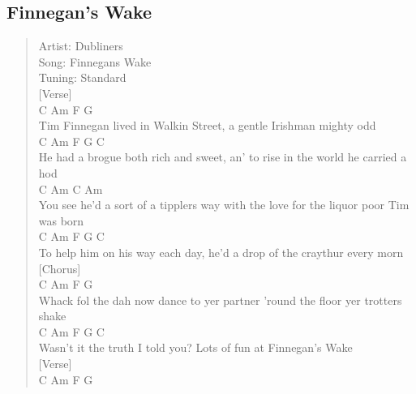 \documentclass[11pt]{article}
\begin{document}
\subsection{Finnegan's Wake}
\label{sec:orgc6c8c46}
\begin{verse}
Artist: Dubliners\\
Song: Finnegans Wake\\
Tuning: Standard\\
\vspace*{1em}
\vspace*{1em}
[Verse]\\
\hspace*{4em}C                 Am               F               G\\
Tim Finnegan lived in Walkin Street, a gentle Irishman mighty odd\\
\hspace*{3em}C                 Am                      F                   G         C\\
He had a brogue both rich and sweet, an' to rise in the world he carried a hod\\
\hspace*{4em}C                    Am                    C                        Am\\
You see he'd a sort of a tipplers way with the love for the liquor poor Tim was born\\
\hspace*{3em}C               Am                   F                    G     C\\
To help him on his way each day, he'd a drop of the craythur every morn\\
\vspace*{1em}
\vspace*{1em}
[Chorus]\\
C                     Am                    F                   G\\
Whack fol the dah now dance to yer partner 'round the floor yer trotters shake\\
C             Am                F              G          C\\
Wasn't it the truth I told you? Lots of fun at Finnegan's Wake\\
\vspace*{1em}
\vspace*{1em}
[Verse]\\
\hspace*{4em}C               Am               F                     G\\

\end{verse}
\end{document}
